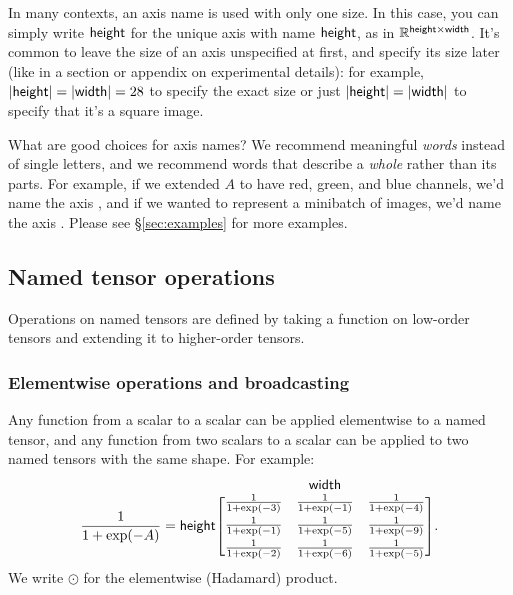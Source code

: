 \documentclass{article}
\makeatletter
\newcommand{\nmatrix}[3]{\name{#1}\begin{array}[b]{@{}c@{}}\name{#2}\\\begin{bmatrix}#3\end{bmatrix}\end{array}}
\makeatother
\begin{document}
In many contexts, an axis name is used with only one size. In this case, you can simply write $\mathsf{height}$ for the unique axis with name $\mathsf{height}$, as in $\mathbb{R}^{\mathsf{height} \times \mathsf{width}}$. It's common to leave the size of an axis unspecified at first, and specify its size later (like in a section or appendix on experimental details): for example, $|\mathsf{height}|=|\mathsf{width}|=28$ to specify the exact size or just $|\mathsf{height}|=|\mathsf{width}|$ to specify that it's a square image.

What are good choices for axis names? We recommend meaningful \emph{words} instead of single letters, and we recommend words that describe a \emph{whole} rather than its parts. For example, if we extended $A$ to have red, green, and blue channels, we'd name the axis , and if we wanted to represent a minibatch of images, we'd name the axis . Please see \S\ref{sec:examples} for more examples.

\subsection{Named tensor operations}
\label{sec:operations}

Operations on named tensors are defined by taking a function on low-order tensors and extending it to higher-order tensors.

\subsubsection{Elementwise operations and broadcasting}

Any function from a scalar to a scalar can be applied elementwise to a named tensor, and any function from two scalars to a scalar can be applied to two named tensors with the same shape. For example:
\begin{equation*}
\frac1{1+\exp(-A)} = \nmatrix{height}{width}{
  \frac1{1+\exp(-3)} & \frac1{1+\exp(-1)} & \frac1{1+\exp(-4)} \\[1ex]
  \frac1{1+\exp(-1)} & \frac1{1+\exp(-5)} & \frac1{1+\exp(-9)} \\[1ex]
  \frac1{1+\exp(-2)} & \frac1{1+\exp(-6)} & \frac1{1+\exp(-5)}
}.
\end{equation*}
We write $\odot$ for the elementwise (Hadamard) product.
\end{document}

